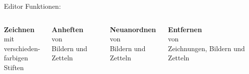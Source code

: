 \documentclass[11pt]{beamer}
\begin{document}
\begin{frame}{Editor}
  Funktionen:\\
  \pause
  \begin{columns}[t]
    \begin{column}{0.24\textwidth}
      \begin{center}
        \textbf{Zeichnen}\\mit\\verschieden-\\farbigen Stiften
      \end{center}
    \end{column}
    \pause
    \begin{column}{0.24\textwidth}
      \begin{center}
        \textbf{Anheften}\\von\\Bildern und Zetteln
      \end{center}
    \end{column}
    \pause
    \begin{column}{0.24\textwidth}
      \begin{center}
        \textbf{Neuanordnen}\\von\\Bildern und Zetteln
      \end{center}
    \end{column}
    \pause
    \begin{column}{0.24\textwidth}
      \begin{center}
        \textbf{Entfernen}\\von\\Zeichnungen, Bildern und Zetteln
      \end{center}
    \end{column}
  \end{columns}



\end{frame}
\end{document}
